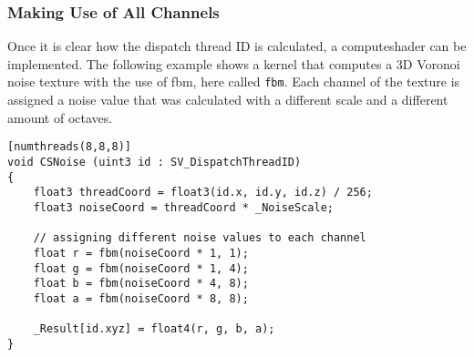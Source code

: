 \begin{figure}[H]
\begin{minipage}{0.47\linewidth}
        \label{img:tikz:compute:threads2}
    \end{minipage}
\end{figure}

\pagebreak

\subsubsection{Making Use of All Channels}
Once it is clear how the dispatch thread ID is calculated, a \gls{computeshader} can be implemented.
The following example shows a \gls{kernel} that computes a 3D Voronoi \gls{noise} texture with the use of \gls{fbm}, here called \lstinline[language=HLSL]{fbm}.
Each channel of the texture is assigned a \gls{noise} value that was calculated with a different scale and a different amount of octaves.

\begin{lstlisting}[language=HLSL, caption=An implementation of a 3D \gls{noise} \gls{computeshader}., label=lst:shader:compute:3dnoise]
[numthreads(8,8,8)]
void CSNoise (uint3 id : SV_DispatchThreadID)
{
    float3 threadCoord = float3(id.x, id.y, id.z) / 256;
    float3 noiseCoord = threadCoord * _NoiseScale;
    
    // assigning different noise values to each channel
    float r = fbm(noiseCoord * 1, 1);
    float g = fbm(noiseCoord * 1, 4);
    float b = fbm(noiseCoord * 4, 8);
    float a = fbm(noiseCoord * 8, 8);

    _Result[id.xyz] = float4(r, g, b, a);
}
\end{lstlisting}

